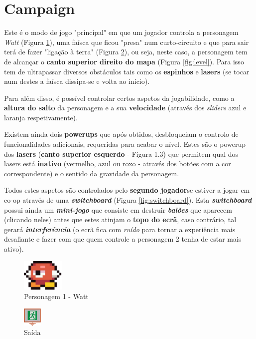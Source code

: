 \documentclass{report}
\begin{document}
\section{Campaign}

Este é o modo de jogo "principal" em que um jogador controla a personagem \textit{Watt} (Figura \ref{fig:watt}), uma faísca que ficou "presa" num curto-circuito e que para sair terá de fazer "ligação à terra" (Figura \ref{fig:exit}), ou seja, neste caso, a personagem tem de alcançar o \textbf{canto superior direito do mapa} (Figura \ref{fig:level}\footnotemark). Para isso tem de ultrapassar diversos obstáculos tais como os \textbf{espinhos} e \textbf{lasers} (se tocar num destes a faísca dissipa-se e volta ao início).

Para além disso, é possível controlar certos aspetos da jogabilidade, como a \textbf{altura do salto} da personagem e a sua \textbf{velocidade} (através dos \textit{sliders} azul e laranja respetivamente). 

Existem ainda dois \textbf{powerups} que após obtidos, desbloqueiam o controlo de funcionalidades adicionais, requeridas para acabar o nível. Estes são o powerup dos \textbf{lasers} (\textbf{canto superior esquerdo} - Figura 1.3) que permitem qual dos lasers está \textbf{inativo} (vermelho, azul ou roxo - através dos botões com a cor correspondente) e o sentido da gravidade da personagem. 

Todos estes aspetos são controlados pelo \textbf{segundo jogador}se estiver a jogar em co-op através de uma \textbf{\textit{switchboard}} (Figura \ref{fig:switchboard}). Esta \textbf{\textit{switchboard}} possui ainda um \textbf{\textit{mini-jogo}} que consiste em destruir \textbf{\textit{balões}} que aparecem (clicando neles) antes que estes atinjam o \textbf{topo do ecrã}, caso contrário, tal gerará \textbf{\textit{interferência}} (o ecrã fica com \textit{ruído} para tornar a experiência mais desafiante e fazer com que quem controle a personagem 2 tenha de estar mais ativo).

\begin{figure}[H]
	\centering
	\includegraphics{watt}
	\caption{Personagem 1 - Watt}
	\label{fig:watt}
\end{figure}

\begin{figure}[H]
	\centering
	\includegraphics[width=0.08\textwidth]{exit_icon}
	\caption{Saída}
	\label{fig:exit}
\end{figure}
\end{document}
